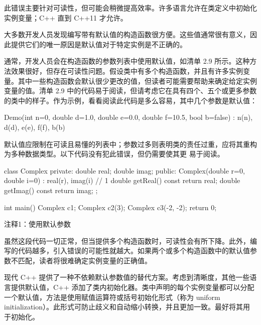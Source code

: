 此错误主要针对可读性，但可能会稍微提高效率。许多语言允许在类定义中初始化实例变量；C++ 直到 C++11 才允许。


大多数开发人员发现编写带有默认值的构造函数很方便。这些值通常很有意义，因此提供它们的唯一原因是默认值对于特定实例是不正确的。

通常，开发人员会在构造函数的参数列表中使用默认值，如清单 2.9 所示。这种方法效果很好，但存在可读性问题。假设类中有多个构造函数，并且有许多实例变量。其中一些构造函数会默认很少更改的值，但读者可能需要帮助来确定给定实例变量的值。清单 2.9 中的代码易于阅读，但请考虑它在具有四个、五个或更多参数的类中的样子。作为示例，看看阅读此代码是多么容易，其中几个参数是默认值：

\begin{cpp}
Demo(int n=0, double d=1.0, double e=0.0, double f=10.5, bool b=false) :
n(n), d(d), e(e), f(f), b(b) {}
\end{cpp}

默认值应限制在可读且易懂的列表中；参数过多则表明类的责任过重，应将其重构为多种数据类型。以下代码没有犯此错误，但仍需要使其更 易于阅读。


\begin{cpp}
class Complex {
private:
  double real;
  double imag;
public:
  Complex(double r=0, double i=0) : real(r), imag(i) {} // 1
  double getReal() const { return real; }
  double getImag() const { return imag; }
};

int main() {
  Complex c1;
  Complex c2(3);
  Complex c3(-2, -2);
  return 0;
}
\end{cpp}

{\footnotesize
注释1：使用默认参数
}


虽然这段代码一切正常，但当提供多个构造函数时，可读性会有所下降。此外，编写的代码越多，引入错误的可能性就越大。如果两个或多个构造函数中的默认值参数不匹配，读者将很难确定实例变量的正确值。


现代 C++ 提供了一种不依赖默认参数值的替代方案。考虑到清晰度，其他一些语言提供默认值，C++ 添加了类内初始化器。类中声明的每个实例变量都可以分配一个默认值，方法是使用赋值运算符或括号初始化形式（称为 uniform initialization）。此形式可防止歧义和自动缩小转换，并且更加一致。最好将其用于初始化。


